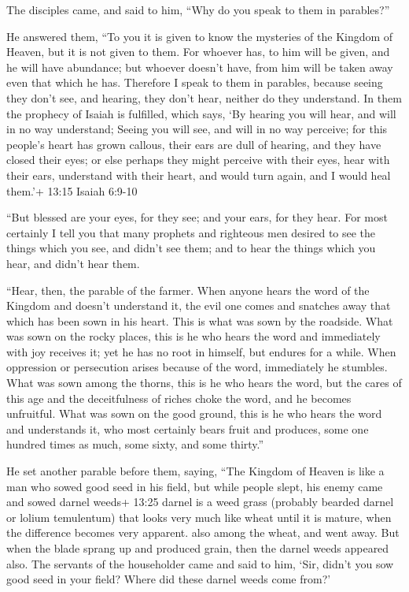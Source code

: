  The disciples came, and said to him, ``Why do you speak to
them in parables?''

 He answered them, ``To you it is given to know the
mysteries of the Kingdom of Heaven, but it is not given to them.
 For whoever has, to him will be given, and he will have
abundance; but whoever doesn't have, from him will be taken away even
that which he has.  Therefore I speak to them in parables,
because seeing they don't see, and hearing, they don't hear, neither do
they understand.  In them the prophecy of Isaiah is
fulfilled, which says, `By hearing you will hear, and will in no way
understand; Seeing you will see, and will in no way perceive;
 for this people's heart has grown callous, their ears are
dull of hearing, and they have closed their eyes; or else perhaps they
might perceive with their eyes, hear with their ears, understand with
their heart, and would turn again, and I would heal them.'+ 13:15 Isaiah
6:9-10

 ``But blessed are your eyes, for they see; and your ears,
for they hear.  For most certainly I tell you that many
prophets and righteous men desired to see the things which you see, and
didn't see them; and to hear the things which you hear, and didn't hear
them.

 ``Hear, then, the parable of the farmer. 
When anyone hears the word of the Kingdom and doesn't understand it, the
evil one comes and snatches away that which has been sown in his heart.
This is what was sown by the roadside.  What was sown on
the rocky places, this is he who hears the word and immediately with joy
receives it;  yet he has no root in himself, but endures
for a while. When oppression or persecution arises because of the word,
immediately he stumbles.  What was sown among the thorns,
this is he who hears the word, but the cares of this age and the
deceitfulness of riches choke the word, and he becomes unfruitful.
 What was sown on the good ground, this is he who hears the
word and understands it, who most certainly bears fruit and produces,
some one hundred times as much, some sixty, and some thirty.''

 He set another parable before them, saying, ``The Kingdom
of Heaven is like a man who sowed good seed in his field, 
but while people slept, his enemy came and sowed darnel weeds+ 13:25
darnel is a weed grass (probably bearded darnel or lolium temulentum)
that looks very much like wheat until it is mature, when the difference
becomes very apparent. also among the wheat, and went away.
 But when the blade sprang up and produced grain, then the
darnel weeds appeared also.  The servants of the
householder came and said to him, `Sir, didn't you sow good seed in your
field? Where did these darnel weeds come from?'

